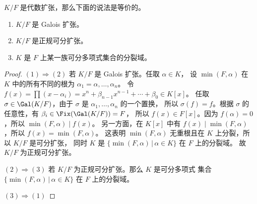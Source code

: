 \begin{theorem}
  $K/F$ 是代数扩张，那么下面的说法是等价的。
  \begin{enumerate}
    \item $K/F$ 是 Galois 扩张。
    \item $K/F$ 是正规可分扩张。
    \item $K$ 是 $F$ 上某一族可分多项式集合的分裂域。
  \end{enumerate}
\end{theorem}
\begin{proof}
  $(1)\Rightarrow (2)$ 若 $K/F$ 是 Galois 扩张。任取 $\alpha\in K$，
  设 $\min(F,\alpha)$ 在 $K$ 中的所有不同的根为 $\alpha_1=\alpha,\dots,\alpha_n$。
  令 $f(x)=\prod(x-\alpha_i)=x^n+\beta_{n-1}x^{n-1}+\cdots+\beta_0\in K[x]$。
  任取 $\sigma\in\Gal(K/F)$，由于 $\sigma$ 是 $\alpha_1,\dots,\alpha_n$ 的一个置换，
  所以 $\sigma(f)=f$。根据 $\sigma$ 的任意性，有 $\beta_i\in\Fix(\Gal(K/F))=F$，
  所以 $f(x)\in F[x]$。因为 $f(\alpha)=0$，所以 $\min(F,\alpha)\mid f(x)$。
  另一方面，在 $K[x]$ 中有 $f(x)\mid \min(F,\alpha)$，所以 $f(x)=\min(F,\alpha)$。
  这表明 $\min(F,\alpha)$ 无重根且在 $K$ 上分裂，所以 $K/F$ 是可分扩张，
  同时 $K$ 是 $\{\min(F,\alpha)\,|\,\alpha\in K\}$ 在 $F$ 上的分裂域。
  故 $K/F$ 为正规可分扩张。

  $(2)\Rightarrow (3)$ 若 $K/F$ 为正规可分扩张。那么 $K$ 是可分多项式
  集合 $\{\min(F,\alpha)\,|\,\alpha\in K\}$ 在 $F$ 上的分裂域。

  $(3)\Rightarrow (1)$ 
\end{proof}




